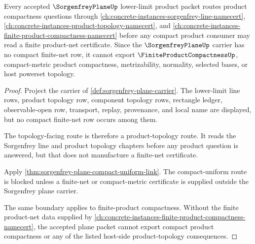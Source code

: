 \begin{theorem}
\label{thm:sorgenfrey-plane-finite-product-compactness-boundary}
Every accepted $\SorgenfreyPlaneUp$ lower-limit product packet routes product compactness questions through \autoref{ch:concrete-instances-sorgenfrey-line-namecert}, \autoref{ch:concrete-instances-product-topology-namecert}, and \autoref{ch:concrete-instances-finite-product-compactness-namecert} before any compact product consumer may read a finite product-net certificate. Since the $\SorgenfreyPlaneUp$ carrier has no compact finite-net row, it cannot export $\FiniteProductCompactnessUp$, compact-metric product compactness, metrizability, normality, selected bases, or host powerset topology.
\end{theorem}
\begin{proof}
Project the carrier of \autoref{def:sorgenfrey-plane-carrier}. The lower-limit line rows, product topology row, component topology rows, rectangle ledger, observable-open row, transport, replay, provenance, and local name are displayed, but no compact finite-net row occurs among them.

The topology-facing route is therefore a product-topology route. It reads the Sorgenfrey line and product topology chapters before any product question is answered, but that does not manufacture a finite-net certificate.

Apply \autoref{thm:sorgenfrey-plane-compact-uniform-link}. The compact-uniform route is blocked unless a finite-net or compact-metric certificate is supplied outside the Sorgenfrey plane carrier.

The same boundary applies to finite-product compactness. Without the finite product-net data supplied by \autoref{ch:concrete-instances-finite-product-compactness-namecert}, the accepted plane packet cannot export compact product compactness or any of the listed host-side product-topology consequences.
\end{proof}
